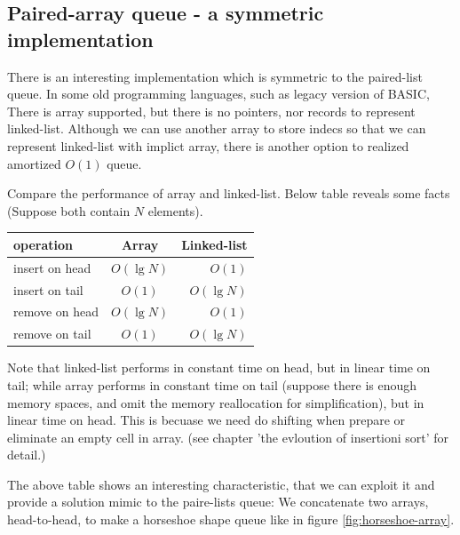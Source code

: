 \documentclass{article}
\begin{document}
\subsection{Paired-array queue - a symmetric implementation}

There is an interesting implementation which is symmetric to the paired-list
queue. In some old programming languages, such as legacy version of BASIC,
There is array supported, but there is no pointers, nor records to represent
linked-list. Although we can use another array to store indecs so that we
can represent linked-list with implict array, there is another option to
realized amortized $O(1)$ queue.

Compare the performance of array and linked-list. Below table reveals some
facts (Suppose both contain $N$ elements).

\begin{tabular}{l | c | r}
  \hline
  operation & Array & Linked-list \\
  \hline
  insert on head & $O(\lg N)$ & $O(1)$ \\
  insert on tail & $O(1)$ & $O(\lg N)$ \\
  remove on head & $O(\lg N)$ & $O(1)$ \\
  remove on tail & $O(1)$ & $O(\lg N)$ \\
  \hline
\end{tabular}

Note that linked-list performs in constant time on head, but in linear time on tail;
while array performs in constant time on tail (suppose there is enough memory spaces, and
omit the memory reallocation for simplification), but in linear time on head.
This is becuase we need do shifting when prepare or eliminate an empty cell in array.
(see chapter 'the evloution of insertioni sort' for detail.)

The above table shows an interesting characteristic, that we can exploit it and provide
a solution mimic to the paire-lists queue: We concatenate two arrays, head-to-head, to
make a horseshoe shape queue like in figure \ref{fig:horseshoe-array}.
\end{document}
